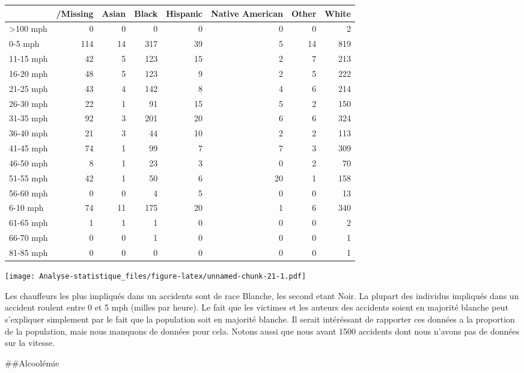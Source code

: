 \documentclass[
  french,
]{article}
\begin{document}
\begin{table}
\centering
\begin{tabular}{l|r|r|r|r|r|r|r}
\hline
  & /Missing & Asian & Black & Hispanic & Native American & Other & White\\
\hline
>100 mph & 0 & 0 & 0 & 0 & 0 & 0 & 2\\
\hline
0-5 mph & 114 & 14 & 317 & 39 & 5 & 14 & 819\\
\hline
11-15 mph & 42 & 5 & 123 & 15 & 2 & 7 & 213\\
\hline
16-20 mph & 48 & 5 & 123 & 9 & 2 & 5 & 222\\
\hline
21-25 mph & 43 & 4 & 142 & 8 & 4 & 6 & 214\\
\hline
26-30 mph & 22 & 1 & 91 & 15 & 5 & 2 & 150\\
\hline
31-35 mph & 92 & 3 & 201 & 20 & 6 & 6 & 324\\
\hline
36-40 mph & 21 & 3 & 44 & 10 & 2 & 2 & 113\\
\hline
41-45 mph & 74 & 1 & 99 & 7 & 7 & 3 & 309\\
\hline
46-50 mph & 8 & 1 & 23 & 3 & 0 & 2 & 70\\
\hline
51-55 mph & 42 & 1 & 50 & 6 & 20 & 1 & 158\\
\hline
56-60 mph & 0 & 0 & 4 & 5 & 0 & 0 & 13\\
\hline
6-10 mph & 74 & 11 & 175 & 20 & 1 & 6 & 340\\
\hline
61-65 mph & 1 & 1 & 1 & 0 & 0 & 0 & 2\\
\hline
66-70 mph & 0 & 0 & 1 & 0 & 0 & 0 & 1\\
\hline
81-85 mph & 0 & 0 & 0 & 0 & 0 & 0 & 1\\
\hline
\end{tabular}
\end{table}

\texttt{[image: Analyse-statistique\_files/figure-latex/unnamed-chunk-21-1.pdf]}

Les chauffeurs les plus impliqués dans un accidents sont de race
Blanche, les second etant Noir. La plupart des individus impliqués dans
un accident roulent entre 0 et 5 mph (milles par heure). Le fait que les
victimes et les auteurs des accidents soient en majorité blanche peut
s'expliquer simplement par le fait que la population soit en majorité
blanche. Il serait intéréssant de rapporter ces données a la proportion
de la population, mais nous manquons de données pour cela. Notons aussi
que nous avant 1500 accidents dont nous n'avons pas de données sur la
vitesse.

\#\#Alcoolémie
\end{document}
